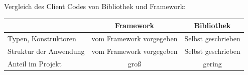Vergleich des Client Codes von Bibliothek und Framework: 

\begin{tabular}{ |l|c|c| } 
    \hline
                                                            & Framework & Bibliothek \\ 
                                                            \hline
    Typen, Konstruktoren                                    & vom Framework vorgegeben  & Selbst geschrieben \\ 
    \hline
    Struktur der Anwendung                                  & vom Framework vorgegeben  & Selbst geschrieben \\
    \hline
    Anteil im Projekt                                       & groß       & gering \\ 
    \hline
\end{tabular}